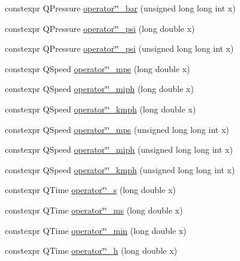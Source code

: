 \begin{DoxyCompactItemize}
\item 
constexpr Q\+Pressure \mbox{\hyperlink{namespaceokapi_1_1literals_aa470b7c898aa5dce28e67d3b095ee683}{operator\char`\"{}\char`\"{}\+\_\+bar}} (unsigned long long int x)
\item 
constexpr Q\+Pressure \mbox{\hyperlink{namespaceokapi_1_1literals_a1f9c5bdd623f5eaf85c0976284c19ff5}{operator\char`\"{}\char`\"{}\+\_\+psi}} (long double x)
\item 
constexpr Q\+Pressure \mbox{\hyperlink{namespaceokapi_1_1literals_a417c6915b7fda121bfd22db3bb721b18}{operator\char`\"{}\char`\"{}\+\_\+psi}} (unsigned long long int x)
\item 
constexpr Q\+Speed \mbox{\hyperlink{namespaceokapi_1_1literals_a22ab9532837f0c5ac3327e6acfbc0b54}{operator\char`\"{}\char`\"{}\+\_\+mps}} (long double x)
\item 
constexpr Q\+Speed \mbox{\hyperlink{namespaceokapi_1_1literals_a8cc3fe94052d38905e4797cc84cff761}{operator\char`\"{}\char`\"{}\+\_\+miph}} (long double x)
\item 
constexpr Q\+Speed \mbox{\hyperlink{namespaceokapi_1_1literals_a811760fb986149d719b1f0f37d2bff7c}{operator\char`\"{}\char`\"{}\+\_\+kmph}} (long double x)
\item 
constexpr Q\+Speed \mbox{\hyperlink{namespaceokapi_1_1literals_a9a35e99b1d8505b3aaf1b1d40fce5a48}{operator\char`\"{}\char`\"{}\+\_\+mps}} (unsigned long long int x)
\item 
constexpr Q\+Speed \mbox{\hyperlink{namespaceokapi_1_1literals_a6f253f324521217cc196304f2e85c0c0}{operator\char`\"{}\char`\"{}\+\_\+miph}} (unsigned long long int x)
\item 
constexpr Q\+Speed \mbox{\hyperlink{namespaceokapi_1_1literals_a34b7a7d505d70d3fddf30234078a3631}{operator\char`\"{}\char`\"{}\+\_\+kmph}} (unsigned long long int x)
\item 
constexpr Q\+Time \mbox{\hyperlink{namespaceokapi_1_1literals_aa500acbe38f044a8d9980f705046918c}{operator\char`\"{}\char`\"{}\+\_\+s}} (long double x)
\item 
constexpr Q\+Time \mbox{\hyperlink{namespaceokapi_1_1literals_adca868a2cc4aefd3551db0c3cea478fe}{operator\char`\"{}\char`\"{}\+\_\+ms}} (long double x)
\item 
constexpr Q\+Time \mbox{\hyperlink{namespaceokapi_1_1literals_aa2bda939825ca29b4d2846fe8b768218}{operator\char`\"{}\char`\"{}\+\_\+min}} (long double x)
\item 
constexpr Q\+Time \mbox{\hyperlink{namespaceokapi_1_1literals_a866775de9a45754bd62ea36f9bd05a54}{operator\char`\"{}\char`\"{}\+\_\+h}} (long double x)

\end{DoxyCompactItemize}
